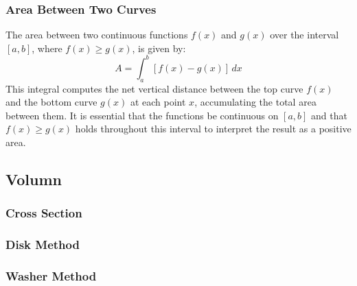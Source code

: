 \documentclass[11pt]{article}
\begin{document}
\subsubsection{Area Between Two Curves}
\begin{figure}[H]
    \centering
\end{figure}
The area between two continuous functions \( f(x) \) and \( g(x) \) over the interval \([a, b]\), where \( f(x) \geq g(x) \), is given by:
\[
    A = \int_a^b \left[ f(x) - g(x) \right]\,dx
\]
This integral computes the net vertical distance between the top curve \( f(x) \) and the bottom curve \( g(x) \) at each point \( x \), accumulating the total area between them. It is essential that the functions be continuous on \([a, b]\) and that \( f(x) \geq g(x) \) holds throughout this interval to interpret the result as a positive area.
\subsection{Volumn}
\subsubsection{Cross Section}
\subsubsection{Disk Method}
\subsubsection{Washer Method}
\end{document}
